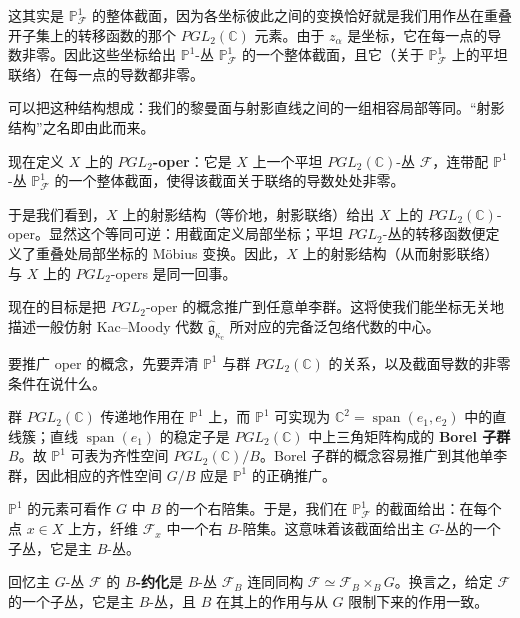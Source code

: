 这其实是 $\mathbb{P}^1_{\mathcal{F}}$ 的整体截面，因为各坐标彼此之间的变换恰好就是我们用作丛在重叠开子集上的转移函数的那个 $PGL_2(\mathbb{C})$ 元素。由于 $z_\alpha$ 是坐标，它在每一点的导数非零。因此这些坐标给出 $\mathbb{P}^1$-丛 $\mathbb{P}^1_{\mathcal{F}}$ 的一个整体截面，且它（关于 $\mathbb{P}^1_{\mathcal{F}}$ 上的平坦联络）在每一点的导数都非零。

可以把这种结构想成：我们的黎曼面与射影直线之间的一组相容局部等同。“射影结构”之名即由此而来。

现在定义 $X$ 上的 \textbf{$PGL_2$-oper}：它是 $X$ 上一个平坦 $PGL_2(\mathbb{C})$-丛 $\mathcal{F}$，连带配 $\mathbb{P}^1$-丛 $\mathbb{P}^1_{\mathcal{F}}$ 的一个整体截面，使得该截面关于联络的导数处处非零。

于是我们看到，$X$ 上的射影结构（等价地，射影联络）给出 $X$ 上的 $PGL_2(\mathbb{C})$-oper。显然这个等同可逆：用截面定义局部坐标；平坦 $PGL_2$-丛的转移函数便定义了重叠处局部坐标的 Möbius 变换。因此，$X$ 上的射影结构（从而射影联络）与 $X$ 上的 $PGL_2$-opers 是同一回事。

现在的目标是把 $PGL_2$-oper 的概念推广到任意单李群。这将使我们能坐标无关地描述一般仿射 Kac--Moody 代数 $\hat{\mathfrak{g}}_{\kappa_c}$ 所对应的完备泛包络代数的中心。

要推广 oper 的概念，先要弄清 $\mathbb{P}^1$ 与群 $PGL_2(\mathbb{C})$ 的关系，以及截面导数的非零条件在说什么。

群 $PGL_2(\mathbb{C})$ 传递地作用在 $\mathbb{P}^1$ 上，而 $\mathbb{P}^1$ 可实现为 $\mathbb{C}^2=\operatorname{span}(e_1,e_2)$ 中的直线簇；直线 $\operatorname{span}(e_1)$ 的稳定子是 $PGL_2(\mathbb{C})$ 中上三角矩阵构成的 \textbf{Borel 子群} $B$。故 $\mathbb{P}^1$ 可表为齐性空间 $PGL_2(\mathbb{C})/B$。Borel 子群的概念容易推广到其他单李群，因此相应的齐性空间 $G/B$ 应是 $\mathbb{P}^1$ 的正确推广。

$\mathbb{P}^1$ 的元素可看作 $G$ 中 $B$ 的一个右陪集。于是，我们在 $\mathbb{P}^1_{\mathcal{F}}$ 的截面给出：在每个点 $x\in X$ 上方，纤维 $\mathcal{F}_x$ 中一个右 $B$-陪集。这意味着该截面给出主 $G$-丛的一个子丛，它是主 $B$-丛。

回忆主 $G$-丛 $\mathcal{F}$ 的 \textbf{$B$-约化}是 $B$-丛 $\mathcal{F}_B$ 连同同构 $\mathcal{F}\simeq\mathcal{F}_B\times_B G$。换言之，给定 $\mathcal{F}$ 的一个子丛，它是主 $B$-丛，且 $B$ 在其上的作用与从 $G$ 限制下来的作用一致。

